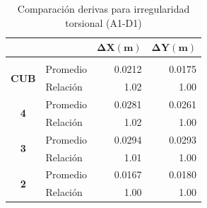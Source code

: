 \documentclass[12pt]{article}
\begin{document}
\begin{table}[H]
  \centering
    \begin{tabular}{|c|l|r|r|}
\cline{3-4}    \multicolumn{1}{r}{} &     & \multicolumn{1}{c|}{\cellcolor[rgb]{ .2,  .247,  .31}\textcolor[rgb]{ 1,  1,  1}{\textbf{$\mathbf{\Delta X (m)}$}}} & \multicolumn{1}{c|}{\cellcolor[rgb]{ .2,  .247,  .31}\textcolor[rgb]{ 1,  1,  1}{\textbf{$\mathbf{\Delta Y (m)}$}}} \bigstrut\\
    \hline
    \rowcolor[rgb]{ .2,  .247,  .31} \multicolumn{4}{|c|}{\textcolor[rgb]{ 1,  1,  1}{\textbf{A1-D1}}} \bigstrut\\
    \hline
    \multirow{2}[4]{*}{\textbf{CUB}} & Promedio & 0.0212 & 0.0175 \bigstrut\\
\cline{2-4}        & Relación & 1.02 & 1.00 \bigstrut\\
    \hline
    \multirow{2}[4]{*}{\textbf{4}} & Promedio & 0.0281 & 0.0261 \bigstrut\\
\cline{2-4}        & Relación & 1.02 & 1.00 \bigstrut\\
    \hline
    \multirow{2}[4]{*}{\textbf{3}} & Promedio & 0.0294 & 0.0293 \bigstrut\\
\cline{2-4}        & Relación & 1.01 & 1.00 \bigstrut\\
    \hline
    \multirow{2}[4]{*}{\textbf{2}} & Promedio & 0.0167 & 0.0180 \bigstrut\\
\cline{2-4}        & Relación & 1.00 & 1.00 \bigstrut\\
    \hline
    \end{tabular}%

    \caption{Comparación derivas para irregularidad torsional (A1-D1)}
  \label{tab:A1-D1}%
\end{table}%
\end{document}
